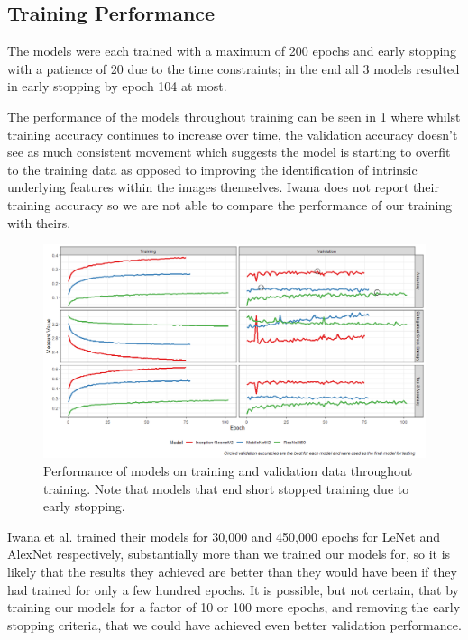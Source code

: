 \documentclass[12pt]{article}
\numberwithin{equation}{section}
\numberwithin{figure}{section}
\begin{document}
\subsection{Training Performance} 
\label{sub:Training_Performance} 
The models were each trained with a maximum of 200 epochs and early stopping with a patience of 20 due to the time constraints; in the end all 3 models resulted in early stopping by epoch 104 at most. 

The performance of the models throughout training can be seen in \cref{fig:train_perf} where whilst training accuracy continues to increase over time, the validation accuracy doesn't see as much consistent movement which suggests the model is starting to overfit to the training data as opposed to improving the identification of intrinsic underlying features within the images themselves. Iwana does not report their training accuracy so we are not able to compare the performance of our training with theirs.

\begin{figure}
	\centering
	\captionsetup{justification=centering}
	\includegraphics[scale=0.5]{training_results.png}
	\caption{Performance of models on training and validation data throughout training. Note that models that end short stopped training due to early stopping.}
	\label{fig:train_perf}
\end{figure}

Iwana et al. trained their models for 30,000 and 450,000 epochs for LeNet and AlexNet respectively, substantially more than we trained our models for, so it is likely that the results they achieved are better than they would have been if they had trained for only a few hundred epochs. It is possible, but not certain, that by training our models for a factor of 10 or 100 more epochs, and removing the early stopping criteria, that we could have achieved even better validation performance. 
\end{document}
